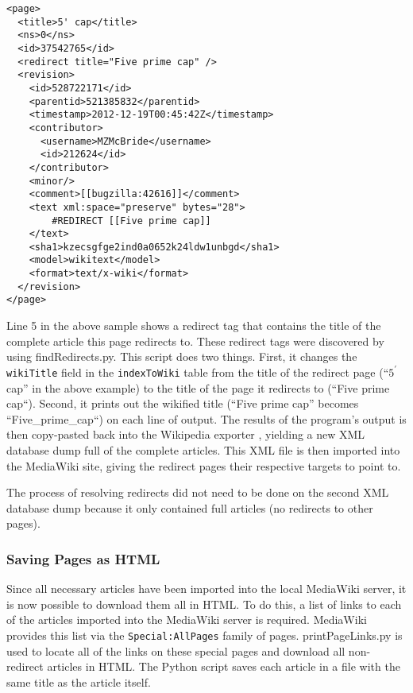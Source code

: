 \begin{lstlisting}
<page>
  <title>5' cap</title>
  <ns>0</ns>
  <id>37542765</id>
  <redirect title="Five prime cap" />
  <revision>
    <id>528722171</id>
    <parentid>521385832</parentid>
    <timestamp>2012-12-19T00:45:42Z</timestamp>
    <contributor>
      <username>MZMcBride</username>
      <id>212624</id>
    </contributor>
    <minor/>
    <comment>[[bugzilla:42616]]</comment>
    <text xml:space="preserve" bytes="28">
        #REDIRECT [[Five prime cap]]
    </text>
    <sha1>kzecsgfge2ind0a0652k24ldw1unbgd</sha1>
    <model>wikitext</model>
    <format>text/x-wiki</format>
  </revision>
</page>
\end{lstlisting}

Line 5 in the above sample shows a redirect tag that contains the title of the complete article this page redirects to.
These redirect tags were discovered by using findRedirects.py.
This script does two things.
First, it changes the {\tt wikiTitle} field in the {\tt indexToWiki} table from the title of the redirect page (``$5^\prime$ cap'' in the above example) to the title of the page it redirects to (``Five prime cap``).
Second, it prints out the wikified title (``Five prime cap'' becomes ``Five\_prime\_cap``) on each line of output.
The results of the program's output is then copy-pasted back into the Wikipedia exporter \cite{wiki-exporter}, yielding a new XML database dump full of the complete articles.
This XML file is then imported into the MediaWiki site, giving the redirect pages their respective targets to point to.

The process of resolving redirects did not need to be done on the second XML database dump because it only contained full articles (no redirects to other pages).

\subsubsection{Saving Pages as HTML}
\label{sec:html-pages}

Since all necessary articles have been imported into the local MediaWiki server, it is now possible to download them all in HTML.
To do this, a list of links to each of the articles imported into the MediaWiki server is required.
MediaWiki provides this list via the {\tt Special:AllPages} family of pages.
printPageLinks.py is used to locate all of the links on these special pages and download all non-redirect articles in HTML.
The Python script saves each article in a file with the same title as the article itself.

